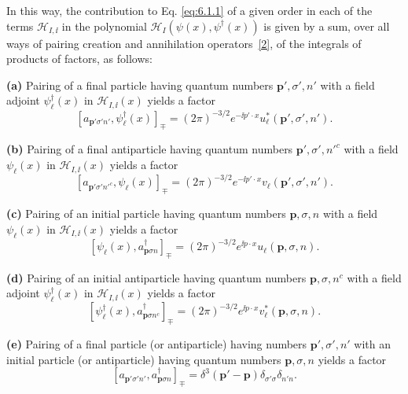 In this way, the contribution to Eq. \eqref{eq:6.1.1} of a given order in each of the
terms $\mathcal H_{I,\ii}$ in the polynomial
$\mathcal H_I(\psi(x),\psi^\dagger(x))$ is given by a sum, over all ways of
pairing creation and annihilation operators~\hyperref[ref:6.2]{[2]}, of the integrals of products
of factors, as follows:

\noindent\textbf{(a)} Pairing of a final particle having quantum numbers
$\mathbf p',\sigma',n'$ with a field adjoint $\psi_\ell^\dagger(x)$ in
$\mathcal H_{I,\ii}(x)$ yields a factor
\begin{equation}
\left[a_{\mathbf p'\sigma'n'},\psi_\ell^\dagger(x)\right]_{\mp}
=(2\pi)^{-3/2}e^{-\ii p'\cdot x}u_\ell^*(\mathbf p',\sigma',n').
\tag{6.1.9}
\label{eq:6.1.9}
\end{equation}

\noindent\textbf{(b)} Pairing of a final antiparticle having quantum numbers
$\mathbf p',\sigma',n'^c$ with a field $\psi_\ell(x)$ in
$\mathcal H_{I,\ii}(x)$ yields a factor
\begin{equation}
\left[a_{\mathbf p'\sigma'n'^c},\psi_\ell(x)\right]_{\mp}
=(2\pi)^{-3/2}e^{-\ii p'\cdot x}v_\ell(\mathbf p',\sigma',n').
\tag{6.1.10}
\label{eq:6.1.10}
\end{equation}

\noindent\textbf{(c)} Pairing of an initial particle having quantum numbers
$\mathbf p,\sigma,n$ with a field $\psi_\ell(x)$ in
$\mathcal H_{I,\ii}(x)$ yields a factor
\begin{equation}
\left[\psi_\ell(x),a^\dagger_{\mathbf p\sigma n}\right]_{\mp}
=(2\pi)^{-3/2}e^{\ii p\cdot x}u_\ell(\mathbf p,\sigma,n).
\tag{6.1.11}
\label{eq:6.1.11}
\end{equation}

\noindent\textbf{(d)} Pairing of an initial antiparticle having quantum
numbers $\mathbf p,\sigma,n^c$ with a field adjoint
$\psi_\ell^\dagger(x)$ in $\mathcal H_{I,\ii}(x)$ yields a factor
\begin{equation}
\left[\psi_\ell^\dagger(x),a^\dagger_{\mathbf p\sigma n^c}\right]_{\mp}
=(2\pi)^{-3/2}e^{\ii p\cdot x}v_\ell^*(\mathbf p,\sigma,n).
\tag{6.1.12}
\label{eq:6.1.12}
\end{equation}

\noindent\textbf{(e)} Pairing of a final particle (or antiparticle) having
numbers $\mathbf p',\sigma',n'$ with an initial particle (or antiparticle)
having quantum numbers $\mathbf p,\sigma,n$ yields a factor
\begin{equation}
\left[a_{\mathbf p'\sigma'n'},a^\dagger_{\mathbf p\sigma n}\right]_{\mp}
=\delta^3(\mathbf p'-\mathbf p)\delta_{\sigma'\sigma}\delta_{n'n}.
\tag{6.1.13}
\label{eq:6.1.13}
\end{equation}

